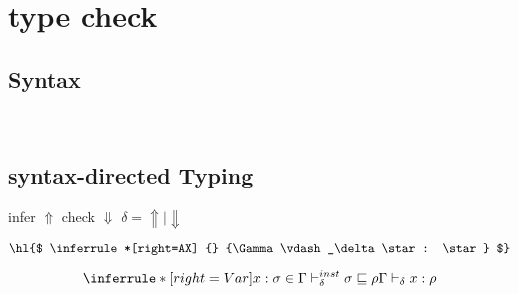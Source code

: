 \section{type check}

\subsection{Syntax}
\gram{\otte\ottinterrule
      \ottS\ottinterrule
      \ottR\ottinterrule
  }
\\[2.0mm]


\subsection{syntax-directed Typing}

\newcommand{\pgm}{\mathsf{P}}
\newcommand{\nat}{\mathsf{nat}}
\newcommand{\logic}{\mathsf{L}}
\newcommand{\judge}{\Gamma\vdash}

\newcommand{\checktype}{\Gamma\vdash_\Downarrow}
\newcommand{\infertype}{\Gamma\vdash_\Uparrow}
\newcommand{\infercheck}{\Gamma\vdash_\delta}

\newcommand{\checktypeno}{\vdash_\Downarrow}
\newcommand{\infertypeno}{\vdash_\Uparrow}
\newcommand{\infercheckno}{\vdash_\delta}

\newcommand{\instinfer}{\vdash^{inst}_\Uparrow}
\newcommand{\instcheck}{\vdash^{inst}_\Downarrow}
\newcommand{\instinfercheck}{\vdash^{inst}_\delta}

\newcommand{\polyinfer}{\vdash^{poly}_\Uparrow}
\newcommand{\polycheck}{\vdash^{poly}_\Downarrow}
\newcommand{\polyinfercheck}{\vdash^{poly}_\delta}

\newcommand{\polymorphic}{\vdash^{dsk}}
\newcommand{\polymorphicstar}{\vdash^{dsk\star}}

\newcommand{\substlet}{\textcolor{blue}{subst\_let}}


\framebox{$ \judge e : \rho$ } infer $\Uparrow$ check $\Downarrow$ $\delta = \Uparrow \mid \Downarrow$

\[
\hl{$
\inferrule*[right=AX]
{} {\infercheck \star : \star}
$}
\]

\[
\inferrule*[right=Var]
{x:\sigma \in \Gamma \\ \instinfercheck \sigma \sqsubseteq \rho } {\infercheck x : \rho}
\]

